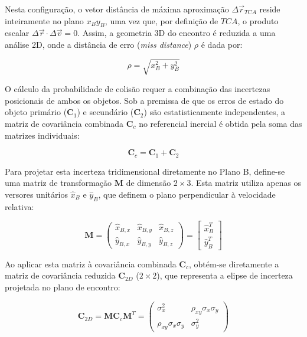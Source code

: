 Nesta configuração, o vetor distância de máxima aproximação $\Delta \vec{r}_{TCA}$ reside inteiramente no plano $x_B y_B$, uma vez que, por definição de $TCA$, o produto escalar $\Delta \vec{r} \cdot \Delta \vec{v} = 0$. Assim, a geometria 3D do encontro é reduzida a uma análise 2D, onde a distância de erro (\textit{miss distance}) $\rho$ é dada por:

\begin{equation}
    \rho = \sqrt{x_{B}^2 + y_{B}^2}
\end{equation}

O cálculo da probabilidade de colisão requer a combinação das incertezas posicionais de ambos os objetos. Sob a premissa de que os erros de estado do objeto primário ($\mathbf{C}_1$) e secundário ($\mathbf{C}_2$) são estatisticamente independentes, a matriz de covariância combinada $\mathbf{C}_c$ no referencial inercial é obtida pela soma das matrizes individuais:

\begin{equation}
    \mathbf{C}_c = \mathbf{C}_1 + \mathbf{C}_2
\end{equation}

Para projetar esta incerteza tridimensional diretamente no Plano B, define-se uma matriz de transformação $\mathbf{M}$ de dimensão $2 \times 3$. Esta matriz utiliza apenas os versores unitários $\hat{x}_B$ e $\hat{y}_B$, que definem o plano perpendicular à velocidade relativa:

\begin{equation}
    \mathbf{M} = \begin{pmatrix} 
    \hat{x}_{B,x} & \hat{x}_{B,y} & \hat{x}_{B,z} \\ 
    \hat{y}_{B,x} & \hat{y}_{B,y} & \hat{y}_{B,z} 
    \end{pmatrix} = \begin{bmatrix} \hat{x}_B^T \\ \hat{y}_B^T \end{bmatrix}
\end{equation}

Ao aplicar esta matriz à covariância combinada $\mathbf{C}_c$, obtém-se diretamente a matriz de covariância reduzida $\mathbf{C}_{2D}$ ($2 \times 2$), que representa a elipse de incerteza projetada no plano de encontro:

\begin{equation}
    \mathbf{C}_{2D} = \mathbf{M} \mathbf{C}_c \mathbf{M}^T = \begin{pmatrix} 
    \sigma_x^2 & \rho_{xy}\sigma_x\sigma_y \\ 
    \rho_{xy}\sigma_x\sigma_y & \sigma_y^2 
    \end{pmatrix}
\end{equation}

